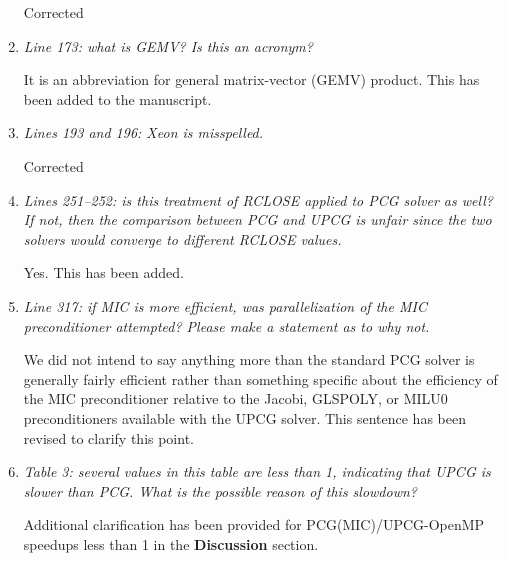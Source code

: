\documentclass[12pt]{article} %
\begin{document}
\begin{enumerate}
Corrected

\item \textit{Line 173: what is GEMV? Is this an acronym?}

It is an abbreviation for general matrix-vector (GEMV) product. This has been added to the manuscript.

\item \textit{Lines 193 and 196: Xeon is misspelled.}

Corrected

\item \textit{Lines 251--252: is this treatment of RCLOSE applied to PCG solver as well? If not, then the comparison between PCG and UPCG is unfair since the two solvers would converge to different RCLOSE values.}

Yes. This has been added.

\item \textit{Line 317: if MIC is more efficient, was parallelization of the MIC preconditioner attempted? Please make a statement as to why not.}

We did not intend to say anything more than the standard PCG solver is generally fairly efficient rather than something specific about the efficiency of the MIC preconditioner relative to the Jacobi, GLSPOLY, or MILU0 preconditioners available with the UPCG solver. This sentence has been revised to clarify this point.

\item \textit{Table 3: several values in this table are less than 1, indicating that UPCG is slower than PCG. What is the possible reason of this slowdown?}

Additional clarification has been provided for PCG(MIC)/UPCG-OpenMP speedups less than 1 in the \textbf{Discussion} section.


\end{enumerate}
\end{document}
